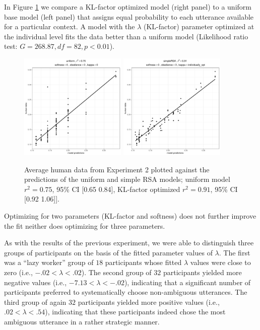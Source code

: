 \documentclass[10pt,a4paper]{article}
\begin{document}
In Figure \ref{kl-factor} we compare a KL-factor optimized model (right panel) to a uniform base model (left panel) that assigns equal probability to each utterance available for a particular context. A model with the $\lambda$ (KL-factor) parameter optimized at the individual level fits the data better than a uniform model  (Likelihood ratio test: $G = 268.87, df = 82, p <0.01$). 
\begin{figure}[ht]
	\centering
	\includegraphics[width=2in]{images/x3_m20.pdf}
	\includegraphics[width=2in]{images/x3_m11.pdf}
	\caption{Average human data from Experiment 2 plotted against the predictions of the uniform and simple RSA models; uniform model  $r^{2}=0.75$, 95\% CI [0.65 0.84], KL-factor optimized  $r^{2}=0.91$, 95\% CI [0.92 1.06]]. }\label{kl-factor}
\end{figure}
Optimizing for two parameters (KL-factor and softness) does not further improve the fit  %
neither does optimizing for three parameters. %

As with the results of the previous experiment, we were able to distinguish three groups of participants on the basis of the fitted parameter values of $\lambda$. 
The first was a ``lazy worker'' group of $18$ participants whose fitted $\lambda$ values were close to zero (i.e.,  $-.02 < \lambda<.02$).
The second group of $32$ participants yielded more negative values (i.e., $-7.13<\lambda<-.02$), indicating that a significant number of participants preferred to systematically choose non-ambiguous utterances. 
The third group of again $32$ participants yielded more positive values (i.e., $.02<\lambda<.54$), indicating that these participants indeed chose the most ambiguous utterance in a rather strategic manner. 
\end{document}
